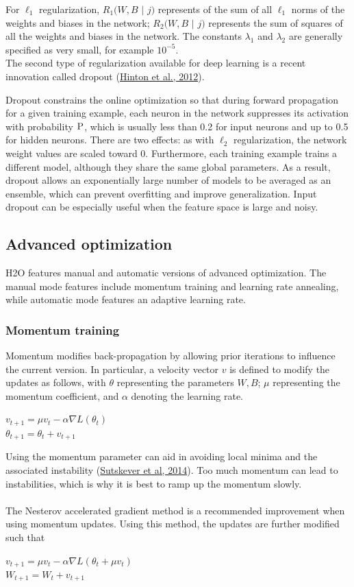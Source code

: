 \documentclass{article}[11pt]
\begin{document}
For $\ell_1$ regularization, $R_1(W,B$ $|$ $j)$ represents of the sum of all $\ell_1$ norms of the weights and biases in the network; $R_2(W,B$ $|$ $j)$ represents the sum of squares of all the weights and biases in the network. The constants $\lambda_1$ and $\lambda_2$ are generally specified as very small, for example $10^{-5}$.
\\
The second type of regularization available for deep learning is a recent innovation called dropout (\href{http://arxiv.org/pdf/1207.0580.pdf}{Hinton et al., 2012}). 

Dropout constrains the online optimization so that during forward propagation for a given training example, each neuron in the network suppresses its activation with probability $\textsc{P}$, which is usually less than 0.2 for input neurons and up to 0.5 for hidden neurons. There are two effects: as with $\ell_2$ regularization, the network weight values are scaled toward 0. Furthermore, each training example trains a different model, although they share the same global parameters. As a result, dropout allows an exponentially large number of models to be averaged as an ensemble, which can prevent overfitting and improve generalization. Input dropout can be especially useful when the feature space is large and noisy.

\subsection{Advanced optimization} 
H2O features manual and automatic versions of advanced optimization. The manual mode features include momentum training and learning rate annealing, while automatic mode features an adaptive learning rate.

\subsubsection{Momentum training}
\label{sssec:MomentumTraining}
Momentum modifies back-propagation by allowing prior iterations to influence the current version. In particular, a velocity vector $v$ is defined to modify the updates as follows, with $\theta$ representing the parameters $W,B$; $\mu$ representing the momentum coefficient, and $\alpha$ denoting the learning rate. 
\begin{center}
$v_{t+1} = \mu v_t - \alpha \nabla L(\theta_t)$
\\
$\theta_{t+1} = \theta_t + v_{t+1}$
\end{center}
Using the momentum parameter can aid in avoiding 
local minima and the associated instability (\href{http://www.cs.toronto.edu/~fritz/absps/momentum.pdf}{Sutskever et al, 2014}). Too much momentum can lead to instabilities, which is why it is best to ramp up the momentum slowly.
\\
\\
The Nesterov accelerated gradient method is a recommended improvement when using momentum updates. Using this method, the updates are further modified such that 
\begin{center}
$v_{t+1} = \mu v_t - \alpha \nabla L(\theta_t + \mu v_t)$
\\
$W_{t+1} = W_t + v_{t+1}$
\end{center}
\end{document}
